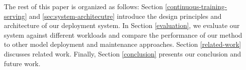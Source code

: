 The rest of this paper is organized as follows:
Section \ref{continuous-training-serving} and \ref{sec:system-architecutre} introduce the design principles and architecture of our deployment system.
In Section \ref{evaluation}, we evaluate our system against different workloads and compare the performance of our method to other model deployment and maintenance approaches. 
Section \ref {related-work} discusses related work.
Finally, Section \ref{conclusion} presents our conclusion and future work.
%


